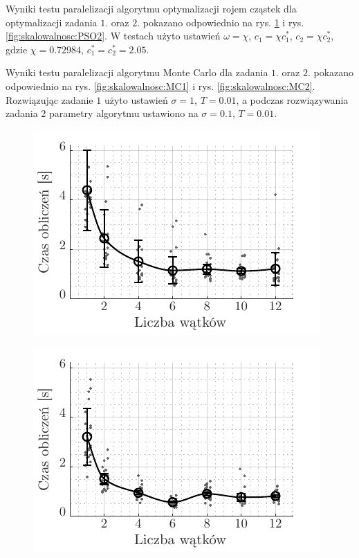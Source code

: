 \documentclass[11pt, a4paper, oneside]{article}
\begin{document}
Wyniki testu paralelizacji algorytmu optymalizacji rojem cząstek dla optymalizacji zadania $1$. oraz $2$. pokazano odpowiednio na rys. \ref{fig:skalowalnosc:PSO1} i rys. \ref{fig:skalowalnosc:PSO2}. W testach użyto ustawień $\omega = \chi$, $c_1 = \chi c_1^*$, $c_2 = \chi c_2^*$, gdzie $\chi = 0.72984$, $c_1^* = c_2^* = 2.05$.

Wyniki testu paralelizacji algorytmu Monte Carlo dla zadania $1$. oraz $2$. pokazano odpowiednio na rys. \ref{fig:skalowalnosc:MC1} i rys. \ref{fig:skalowalnosc:MC2}. Rozwiązując zadanie $1$ użyto ustawień $\sigma = 1$, $T = 0.01$, a podczas rozwiązywania zadania $2$ parametry algorytmu ustawiono na $\sigma = 0.1$, $T = 0.01$.

\begin{figure}[h]
\centering
\begin{minipage}[b]{\dimexpr.5\textwidth-1em}
  \centering
  \includegraphics[width=1\linewidth]{grafiki/skalowalnosc_PSO_z1.pdf}
  \label{fig:skalowalnosc:PSO1}
\end{minipage} \hfill
\begin{minipage}[b]{\dimexpr.5\textwidth-1em}
  \centering
  \includegraphics[width=1\linewidth]{grafiki/skalowalnosc_PSO_z2.pdf}

\end{minipage}
\end{figure}
\end{document}

